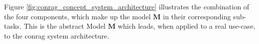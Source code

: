 Figure \ref{fig:conrag_concept_system_architecture} illustrates the combination of the four components, which make up the model $\mathbf{M}$ in their corresponding sub-tasks. This is the abstract Model $\mathbf{M}$ which leads, when applied to a real use-case, to the \gls{conrag} system architecture.






